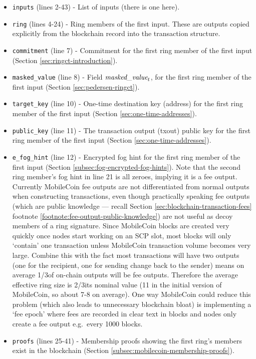 \begin{appendices}
\begin{itemize}
	\item {\tt inputs} (lines 2-43) - List of inputs (there is one here).
	\item {\tt ring} (lines 4-24) - Ring members of the first input. These are outputs copied explicitly from the blockchain record into the transaction structure.
	\item {\tt commitment} (line 7) - Commitment for the first ring member of the first input (Section \ref{sec:ringct-introduction}).
	\item {\tt masked\_value} (line 8) - Field $\textrm{\em masked\_value}_t$, for the first ring member of the first input (Section \ref{sec:pedersen-ringct}).
	\item {\tt target\_key} (line 10) - One-time destination key (address) for the first ring member of the first input (Section \ref{sec:one-time-addresses}).
	\item {\tt public\_key} (line 11) - The transaction output (txout) public key for the first ring member of the first input (Section \ref{sec:one-time-addresses}).
	\item {\tt e\_fog\_hint} (line 12) - Encrypted fog hint for the first ring member of the first input (Section \ref{subsec:fog-encrypted-fog-hints}). Note that the second ring member's fog hint in line 21 is all zeroes, implying it is a fee output. Currently MobileCoin fee outputs are not differentiated from normal outputs when constructing transactions, even though practically speaking fee outputs (which are public knowledge --- recall Section \ref{sec:blockchain-transaction-fees} footnote \ref{footnote:fee-output-public-knowledge}) are not useful as decoy members of a ring signature. Since MobileCoin blocks are created very quickly once nodes start working on an SCP slot, most blocks will only `contain' one transaction unless MobileCoin transaction volume becomes very large. Combine this with the fact most transactions will have two outputs (one for the recipient, one for sending change back to the sender) means on average 1/3\rd of on-chain outputs will be fee outputs. Therefore the average effective ring size is 2/3\rds its nominal value (11 in the initial version of MobileCoin, so about 7-8 on average). One way MobileCoin could reduce this problem (which also leads to unnecessary blockchain bloat) is implementing a `fee epoch' where fees are recorded in clear text in blocks and nodes only create a fee output e.g.\ every 1000 blocks.
	\item {\tt proofs} (lines 25-41) - Membership proofs showing the first ring's members exist in the blockchain (Section \ref{subsec:mobilecoin-membership-proofs}).

\end{itemize}
\end{appendices}
